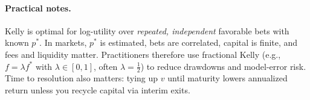 \paragraph{Practical notes.}
Kelly is optimal for log-utility over \emph{repeated, independent} favorable bets with known $p^*$. In markets, $p^*$ is estimated, bets are correlated, capital is finite, and fees and liquidity matter. Practitioners therefore use fractional Kelly (e.g., $f=\lambda f^*$ with $\lambda\in[0,1]$, often $\lambda=\tfrac{1}{2}$) to reduce drawdowns and model-error risk. Time to resolution also matters: tying up $v$ until maturity lowers annualized return unless you recycle capital via interim exits.
